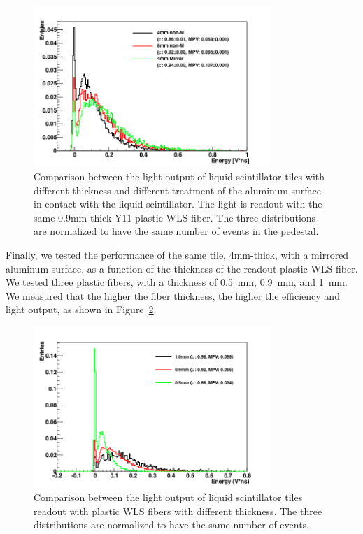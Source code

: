 \documentclass[review]{elsarticle}
\begin{document}
\begin{figure}[!ht]
\begin{center}
\includegraphics[width=0.8\textwidth]{./figures/list_NEW_PROTOTYPES_all.png}
\caption{Comparison between the light output of liquid scintillator
  tiles with different thickness and different treatment of the
  aluminum surface in contact with the liquid scintillator. The light
  is readout with the same 0.9mm-thick Y11 plastic WLS fiber. The
  three distributions are normalized to have the same number of events
  in the pedestal.}
\label{fig:thickness_comp}
\end{center}
\end{figure}

Finally, we tested the performance of the same tile, 4mm-thick, with a
mirrored aluminum surface, as a function of the thickness of the
readout plastic WLS fiber. We tested three plastic fibers, with a
thickness of 0.5~mm, 0.9~mm, and 1~mm. We measured that the higher the
fiber thickness, the higher the efficiency and light output, as shown
in Figure~\ref{fig:fiber_thickness_comp}.

\begin{figure}[!ht]
\begin{center}
\includegraphics[width=0.8\textwidth]{./figures/list_Fiber_Thickness_all_1.png}
\caption{Comparison between the light output of liquid scintillator
  tiles readout with plastic WLS fibers with different thickness. The
  three distributions are normalized to have the same number of
  events.}
\label{fig:fiber_thickness_comp}
\end{center}
\end{figure}
\end{document}
